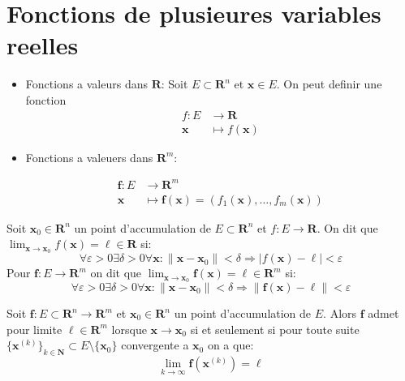 \chapter{Fonctions de plusieures variables reelles}
\begin{example}
\begin{itemize}
\item Fonctions a valeurs dans $\mathbf{R}$: Soit $E\subset \mathbf{R}^{n}$ et $\boldsymbol{x}\in E$. On peut definir une fonction 
\begin{align*}
f:E & \to \mathbf{R} \\
\boldsymbol{x} & \mapsto f(\boldsymbol{x})
\end{align*}

\item Fonctions a valeuers dans $\mathbf{R}^{m}$:

\begin{align*}
\boldsymbol{f}:E & \to \mathbf{R}^{m} \\
\boldsymbol{x} & \mapsto \boldsymbol{f}(\boldsymbol{x})=(f_{1}(\boldsymbol{x}),\dots,f_{m}(\boldsymbol{x}))
\end{align*}

\end{itemize}
\end{example}
\begin{definition}[Limite]
Soit $\boldsymbol{x}_{0}\in \mathbf{R}^{n}$ un point d'accumulation de $E\subset \mathbf{R}^{n}$ et $f:E\to \mathbf{R}$. On dit que $\lim_{ \boldsymbol{x} \to \boldsymbol{x}_{0}}f(\boldsymbol{x})=\ell \in \mathbf{R}$ si:
$$
\forall\varepsilon>0\exists\delta>0\forall \boldsymbol{x}:\lVert \boldsymbol{x}-\boldsymbol{x}_{0} \rVert <\delta \Rightarrow |f(\boldsymbol{x})-\ell|<\varepsilon
$$
Pour $\boldsymbol{f}:E\to \mathbf{R}^{m}$ on dit que $\lim_{ \boldsymbol{x} \to \boldsymbol{x}_{0} }\boldsymbol{f}(\boldsymbol{x})=\boldsymbol{\ell}\in \mathbf{R}^{m}$ si:
$$
\forall\varepsilon>0\exists\delta>0\forall \boldsymbol{x}:\lVert \boldsymbol{x}-\boldsymbol{x}_{0} \rVert<\delta \Rightarrow \lVert \boldsymbol{f}(\boldsymbol{x})-\boldsymbol{\ell} \rVert <\varepsilon
$$
\end{definition}
\begin{theorem}\label{thm1}
Soit $\boldsymbol{f}:E\subset \mathbf{R}^{n}\to \mathbf{R}^{m}$ et $\boldsymbol{x}_{0}\in \mathbf{R}^{n}$ un point d'accumulation de $E$. Alors $\boldsymbol{f}$ admet pour limite $\boldsymbol{\ell}\in \mathbf{R}^{m}$ lorsque $\boldsymbol{x}\to \boldsymbol{x}_{0}$ si et seulement si pour toute suite $\{ \boldsymbol{x}^{(k)} \}_{k\in \mathbf{N}}\subset E\setminus \{ \boldsymbol{x}_{0} \}$ convergente a $\boldsymbol{x}_{0}$ on a que:
$$
\lim_{ k \to \infty } \boldsymbol{f}(\boldsymbol{x}^{(k)})=\boldsymbol{\ell}
$$
\end{theorem}
